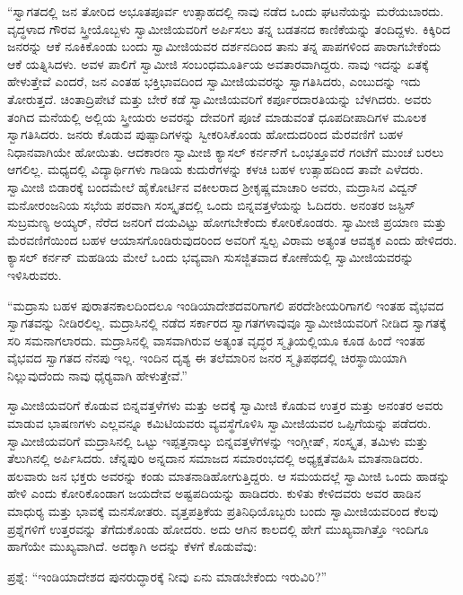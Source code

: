  “ಸ್ವಾಗತದಲ್ಲಿ ಜನ ತೋರಿದ ಅಭೂತಪೂರ್ವ ಉತ್ಸಾಹದಲ್ಲಿ ನಾವು ನಡೆದ ಒಂದು ಘಟನೆಯನ್ನು ಮರೆಯಬಾರದು. ವೃದ್ಧಳಾದ ಗೌರವ ಸ್ತ್ರೀಯೊಬ್ಬಳು ಸ್ವಾಮೀಜಿಯವರಿಗೆ ಅರ್ಪಿಸಲು ತನ್ನ ಬಡತನದ ಕಾಣಿಕೆಯನ್ನು ತಂದಿದ್ದಳು. ಕಿಕ್ಕಿರಿದ ಜನರನ್ನು ಆಕೆ ನೂಕಿಕೊಂಡು ಬಂದು ಸ್ವಾಮೀಜಿಯವರ ದರ್ಶನದಿಂದ ತಾನು ತನ್ನ ಪಾಪಗಳಿಂದ ಪಾರಾಗಬೇಕೆಂದು ಆಕೆ ಯತ್ನಿಸಿದಳು. ಅವಳ ಪಾಲಿಗೆ ಸ್ವಾಮೀಜಿ ಸಂಬಂಧಮೂರ್ತಿಯ ಅವತಾರವಾಗಿದ್ದರು. ನಾವು ಇದನ್ನು ಏತಕ್ಕೆ ಹೇಳುತ್ತೇವೆ ಎಂದರೆ, ಜನ ಎಂತಹ ಭಕ್ತಿಭಾವದಿಂದ ಸ್ವಾಮೀಜಿಯವರನ್ನು ಸ್ವಾಗತಿಸಿದರು, ಎಂಬುದನ್ನು ಇದು ತೋರುತ್ತದೆ. ಚಿಂತಾದ್ರಿಪೇಟೆ ಮತ್ತು ಬೇರೆ ಕಡೆ ಸ್ವಾಮೀಜಿಯವರಿಗೆ ಕರ್ಪೂರದಾರತಿಯನ್ನು ಬೆಳಗಿದರು. ಅವರು ತಂಗಿದ ಮನೆಯಲ್ಲಿ ಅಲ್ಲಿಯ ಸ್ತ್ರೀಯರು ಅವರನ್ನು ದೇವರಿಗೆ ಪೂಜೆ ಮಾಡುವಂತೆ ಧೂಪದೀಪಾದಿಗಳ ಮೂಲಕ ಸ್ವಾಗತಿಸಿದರು. ಜನರು ಕೊಡುವ ಪುಷ್ಪಾದಿಗಳನ್ನು ಸ್ವೀಕರಿಸಿಕೊಂಡು ಹೋದುದರಿಂದ ಮೆರವಣಿಗೆ ಬಹಳ ನಿಧಾನವಾಗಿಯೇ ಹೋಯಿತು. ಆದಕಾರಣ ಸ್ವಾಮೀಜಿ ಕ್ಯಾಸಲ್ ಕರ್ನನ್‍ಗೆ ಒಂಭತ್ತೂವರೆ ಗಂಟೆಗೆ ಮುಂಚೆ ಬರಲು ಆಗಲಿಲ್ಲ. ಮಧ್ಯದಲ್ಲಿ ವಿದ್ಯಾರ್ಥಿಗಳು ಗಾಡಿಯ ಕುದುರೆಗಳನ್ನು ಕಳಚಿ ಬಹಳ ಉತ್ಸಾಹದಿಂದ ತಾವೇ ಎಳೆದರು. ಸ್ವಾಮೀಜಿ ಬಿಡಾರಕ್ಕೆ ಬಂದಮೇಲೆ ಹೈಕೋರ್ಟಿನ ವಕೀಲರಾದ ಶ‍್ರೀಕೃಷ್ಣಮಾಚಾರಿ ಅವರು, ಮದ್ರಾಸಿನ ವಿದ್ವನ್ ಮನೋರಂಜನಿಯ ಸಭೆಯ ಪರವಾಗಿ ಸಂಸ್ಕೃತದಲ್ಲಿ ಒಂದು ಬಿನ್ನವತ್ತಳೆಯನ್ನು ಓದಿದರು. ಅನಂತರ ಜಸ್ಟಿಸ್ ಸುಬ್ರಮಣ್ಯ ಅಯ್ಯರ್, ನೆರೆದ ಜನರಿಗೆ ದಯವಿಟ್ಟು ಹೋಗಬೇಕೆಂದು ಕೋರಿಕೊಂಡರು. ಸ್ವಾಮೀಜಿ ಪ್ರಯಾಣ ಮತ್ತು ಮೆರವಣಿಗೆಯಿಂದ ಬಹಳ ಆಯಾಸಗೊಂಡಿರುವುದರಿಂದ ಅವರಿಗೆ ಸ್ವಲ್ಪ ವಿರಾಮ ಅತ್ಯಂತ ಆವಶ್ಯಕ ಎಂದು ಹೇಳಿದರು. ಕ್ಯಾಸಲ್ ಕರ್ನನ್ ಮಹಡಿಯ ಮೇಲೆ ಒಂದು ಭವ್ಯವಾಗಿ ಸುಸಜ್ಜಿತವಾದ ಕೋಣೆಯಲ್ಲಿ ಸ್ವಾಮೀಜಿಯವರನ್ನು ಇಳಿಸಿರುವರು. 

 “ಮದ್ರಾಸು ಬಹಳ ಪುರಾತನಕಾಲದಿಂದಲೂ ಇಂಡಿಯಾದೇಶದವರಿಗಾಗಲಿ ಪರದೇಶೀಯರಿಗಾಗಲಿ ಇಂತಹ ವೈಭವದ ಸ್ವಾಗತವನ್ನು ನೀಡಿರಲಿಲ್ಲ. ಮದ್ರಾಸಿನಲ್ಲಿ ನಡೆದ ಸರ್ಕಾರದ ಸ್ವಾಗತಗಳಾವುವೂ ಸ್ವಾಮೀಜಿಯವರಿಗೆ ನೀಡಿದ ಸ್ವಾಗತಕ್ಕೆ ಸರಿ ಸಮನಾಗಲಾರದು. ಮದ್ರಾಸಿನಲ್ಲಿ ವಾಸವಾಗಿರುವ ಅತ್ಯಂತ ವೃದ್ಧರ ಸ್ಮೃತಿಯಲ್ಲಿಯೂ ಕೂಡ ಹಿಂದೆ ಇಂತಹ ವೈಭವದ ಸ್ವಾಗತದ ನೆನಪು ಇಲ್ಲ. ಇಂದಿನ ದೃಶ್ಯ ಈ ತಲೆಮಾರಿನ ಜನರ ಸ್ಮೃತಿಪಥದಲ್ಲಿ ಚಿರಸ್ಥಾಯಿಯಾಗಿ ನಿಲ್ಲುವುದೆಂದು ನಾವು ಧೈರ‍್ಯವಾಗಿ ಹೇಳುತ್ತೇವೆ.” 

 ಸ್ವಾಮೀಜಿಯವರಿಗೆ ಕೊಡುವ ಬಿನ್ನವತ್ತಳೆಗಳು ಮತ್ತು ಅದಕ್ಕೆ ಸ್ವಾಮೀಜಿ ಕೊಡುವ ಉತ್ತರ ಮತ್ತು ಅನಂತರ ಅವರು ಮಾಡುವ ಭಾಷಣಗಳು ಎಲ್ಲವನ್ನೂ ಕಮಿಟಿಯವರು ವ್ಯವಸ್ಥೆಗೊಳಿಸಿ ಸ್ವಾಮೀಜಿಯವರ ಒಪ್ಪಿಗೆಯನ್ನು ಪಡೆದರು. ಸ್ವಾಮೀಜಿಯವರಿಗೆ ಮದ್ರಾಸಿನಲ್ಲಿ ಒಟ್ಟು ಇಪ್ಪತ್ತನಾಲ್ಕು ಬಿನ್ನವತ್ತಳೆಗಳನ್ನು ಇಂಗ್ಲೀಷ್, ಸಂಸ್ಕೃತ, ತಮಿಳು ಮತ್ತು ತೆಲುಗಿನಲ್ಲಿ ಅರ್ಪಿಸಿದರು. ಚೆನ್ನಪುರಿ ಅನ್ನದಾನ ಸಮಾಜದ ಸಮಾರಂಭದಲ್ಲಿ ಅಧ್ಯಕ್ಷತೆವಹಿಸಿ ಮಾತನಾಡಿದರು. ಹಲವಾರು ಜನ ಭಕ್ತರು ಅವರನ್ನು ಕಂಡು ಮಾತನಾಡಿಹೋಗುತ್ತಿದ್ದರು. ಆ ಸಮಯದಲ್ಲೆ ಸ್ವಾಮೀಜಿ ಒಂದು ಹಾಡನ್ನು ಹೇಳಿ ಎಂದು ಕೋರಿಕೊಂಡಾಗ ಜಯದೇವ ಅಷ್ಟಪದಿಯನ್ನು ಹಾಡಿದರು. ಕುಳಿತು ಕೇಳಿದವರು ಅವರ ಹಾಡಿನ ಮಾಧುರ‍್ಯ ಮತ್ತು ಭಾವಕ್ಕೆ ಮನಸೋತರು. ವೃತ್ತಪತ್ರಿಕೆಯ ಪ್ರತಿನಿಧಿಯೊಬ್ಬರು ಬಂದು ಸ್ವಾಮೀಜಿಯವರಿಂದ ಕೆಲವು ಪ್ರಶ್ನೆಗಳಿಗೆ ಉತ್ತರವನ್ನು ತೆಗೆದುಕೊಂಡು ಹೋದರು. ಅದು ಆಗಿನ ಕಾಲದಲ್ಲಿ ಹೇಗೆ ಮುಖ್ಯವಾಗಿತ್ತೊ ಇಂದಿಗೂ ಹಾಗೆಯೇ ಮುಖ್ಯವಾಗಿದೆ. ಅದಕ್ಕಾಗಿ ಅದನ್ನು ಕೆಳಗೆ ಕೊಡುವೆವು: 

 ಪ್ರಶ್ನೆ: “ಇಂಡಿಯಾದೇಶದ ಪುನರುದ್ಧಾರಕ್ಕೆ ನೀವು ಏನು ಮಾಡಬೇಕೆಂದು ಇರುವಿರಿ?” 


